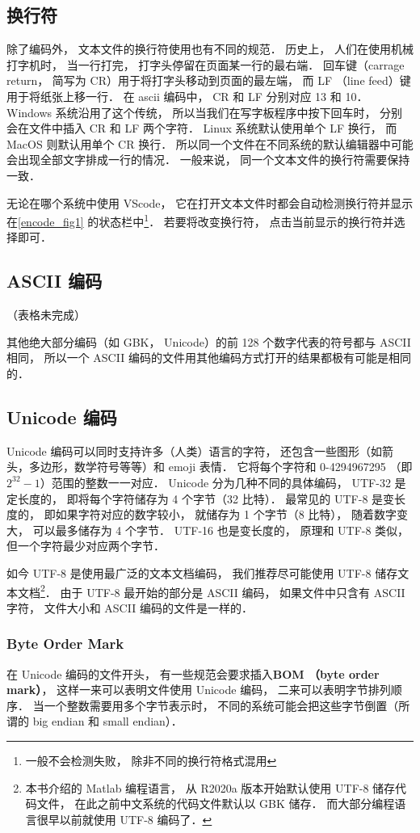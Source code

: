 \subsection{换行符}
除了编码外， 文本文件的换行符使用也有不同的规范． 历史上， 人们在使用机械打字机时， 当一行打完， 打字头停留在页面某一行的最右端． 回车键（carrage return， 简写为 CR）用于将打字头移动到页面的最左端， 而 LF （line feed）键用于将纸张上移一行． 在 ascii 编码中， CR 和 LF 分别对应 13 和 10． Windows 系统沿用了这个传统， 所以当我们在写字板程序中按下回车时， 分别会在文件中插入 CR 和 LF 两个字符． Linux 系统默认使用单个 LF 换行， 而 MacOS 则默认用单个 CR 换行． 所以同一个文件在不同系统的默认编辑器中可能会出现全部文字排成一行的情况． 一般来说， 同一个文本文件的换行符需要保持一致．

无论在哪个系统中使用 VScode， 它在打开文本文件时都会自动检测换行符并显示在\autoref{encode_fig1} 的状态栏中\footnote{一般不会检测失败， 除非不同的换行符格式混用}． 若要将改变换行符， 点击当前显示的换行符并选择即可．

\subsection{ASCII 编码}
（表格未完成）

其他绝大部分编码（如 GBK， Unicode）的前 128 个数字代表的符号都与 ASCII 相同， 所以一个 ASCII 编码的文件用其他编码方式打开的结果都极有可能是相同的．

\subsection{Unicode 编码}
Unicode 编码可以同时支持许多（人类）语言的字符， 还包含一些图形（如箭头，多边形，数学符号等等）和 emoji 表情． 它将每个字符和 0-4294967295 （即 $2^{32}-1$）范围的整数一一对应． Unicode 分为几种不同的具体编码， UTF-32 是定长度的， 即将每个字符储存为 4 个字节（32 比特）． 最常见的 UTF-8 是变长度的， 即如果字符对应的数字较小， 就储存为 1 个字节（8 比特）， 随着数字变大， 可以最多储存为 4 个字节． UTF-16 也是变长度的， 原理和 UTF-8 类似， 但一个字符最少对应两个字节．

如今 UTF-8 是使用最广泛的文本文档编码， 我们推荐尽可能使用 UTF-8 储存文本文档\footnote{本书介绍的 Matlab 编程语言， 从 R2020a 版本开始默认使用 UTF-8 储存代码文件， 在此之前中文系统的代码文件默认以 GBK 储存． 而大部分编程语言很早以前就使用 UTF-8 编码了．}． 由于 UTF-8 最开始的部分是 ASCII 编码， 如果文件中只含有 ASCII 字符， 文件大小和 ASCII 编码的文件是一样的．

\subsubsection{Byte Order Mark}
在 Unicode 编码的文件开头， 有一些规范会要求插入\textbf{BOM （byte order mark）}， 这样一来可以表明文件使用 Unicode 编码， 二来可以表明字节排列顺序． 当一个整数需要用多个字节表示时， 不同的系统可能会把这些字节倒置（所谓的 big endian 和 small endian）．
